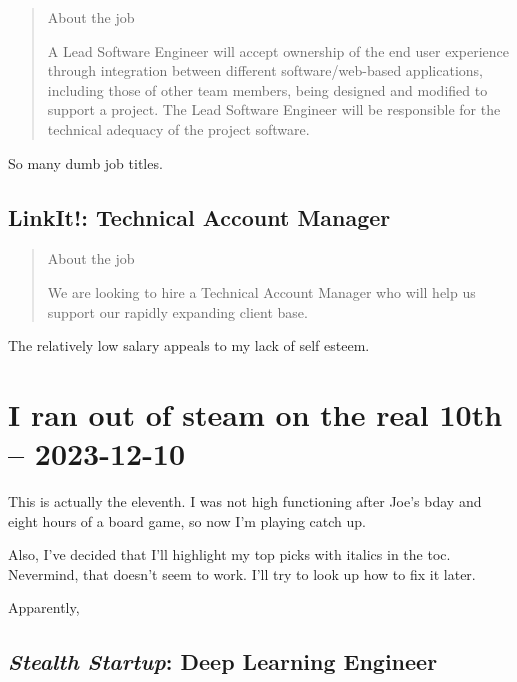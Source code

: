 \documentclass[
	letterpaper, %
	12pt, %
]{CSSullivanBusinessReport}
\begin{document}
\begin{quote}
	About the job
	
	A Lead Software Engineer will accept ownership of the end user experience through integration between different software/web-based applications, including those of other team members, being designed and modified to support a project. The Lead Software Engineer will be responsible for the technical adequacy of the project software.

\end{quote}

So many dumb job titles. 


\subsection[LinkIt!]{LinkIt!: Technical Account Manager}

\begin{quote}
	About the job
	
	We are looking to hire a Technical Account Manager who will help us support our rapidly expanding client base. 

\end{quote}

The relatively low salary appeals to my lack of self esteem. 


\section[10 Dec: Missed]{I ran out of steam on the real 10th -- 2023-12-10} %

This is actually the eleventh. I was not high functioning after Joe's bday and eight hours of a board game, so now I'm playing catch up. 

Also, I've decided that I'll highlight my top picks with italics in the toc. Nevermind, that doesn't seem to work. I'll try to look up how to fix it later.

Apparently, 


\subsection[\textit{Stealth Startup}]{\textit{Stealth Startup}: Deep Learning Engineer}
\end{document}
